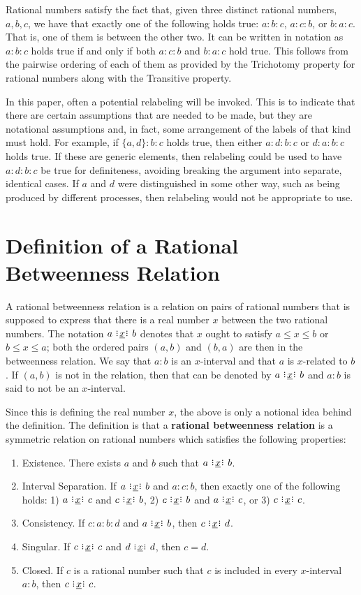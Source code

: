 \documentclass[12pt]{article}
\begin{document}
Rational numbers satisfy the fact that, given three distinct rational numbers, $a, b, c$, we have that exactly one of the following holds true: $a:b:c$, $a:c:b$, or $b:a:c$. That is, one of them is between the other two. It can be written in notation as $a:b:c$ holds true if and only if both \sout{$a:c:b$} and \sout{$b:a:c$} hold true. This follows from the pairwise ordering of each of them as provided by the Trichotomy property for rational numbers along with the Transitive property. 

In this paper, often a potential relabeling will be invoked. This is to indicate that there are certain assumptions that are needed to be made, but they are notational assumptions and, in fact, some arrangement of the labels of that kind must hold. For example, if $\{a,d\}:b:c$ holds true, then either $a:d:b:c$ or $d:a:b:c$ holds true. If these are generic elements, then relabeling could be used to have $a:d:b:c$  be  true for definiteness, avoiding breaking the argument into separate, identical cases. If $a$ and $d$ were distinguished in some other way, such as being produced by different processes, then relabeling would not be appropriate to use. 

\section{Definition of a Rational Betweenness Relation}

A rational betweenness relation is a relation on pairs of rational numbers that is supposed to express that there is a real number $x$ between the two rational numbers. The notation $a \xrel b$ denotes that $x$ ought to satisfy $a \leq x \leq b$ or $b \leq x \leq a$;  both the ordered pairs $(a,b)$ and $(b,a)$ are then in the betweenness relation. We say that $a:b$ is an $x$-interval and that $a$ is $x$-related to $b$. If $(a,b)$ is not in the relation, then that can be denoted by \sout{$a \xrel b$} and $a:b$ is said to not be an $x$-interval. 

Since this is defining the real number $x$, the above is only a notional idea behind the definition. The definition is that a \textbf{rational betweenness relation} is a symmetric relation on rational numbers 
which satisfies the following properties:
\begin{enumerate}
    \item Existence. There exists $a$ and $b$ such that $a\xrel b$.
    \item Interval Separation. If $a \xrel b$ and $a : c : b$, then exactly one of the following holds: 1) $a \xrel c$ and \sout{$c \xrel b$}, 2) $c \xrel b$ and \sout{$a \xrel c$}, or 3) $c \xrel c$. 
    \item Consistency. If $c : a : b : d$ and $a \xrel b$, then $c \xrel d$. 
    \item Singular. If $c \xrel c$ and $d \xrel d$, then $c=d$. 
    \item Closed. If $c$ is a rational number such that $c$ is included in every $x$-interval $a:b$, then  $c \xrel c$. 
\end{enumerate}
\end{document}
